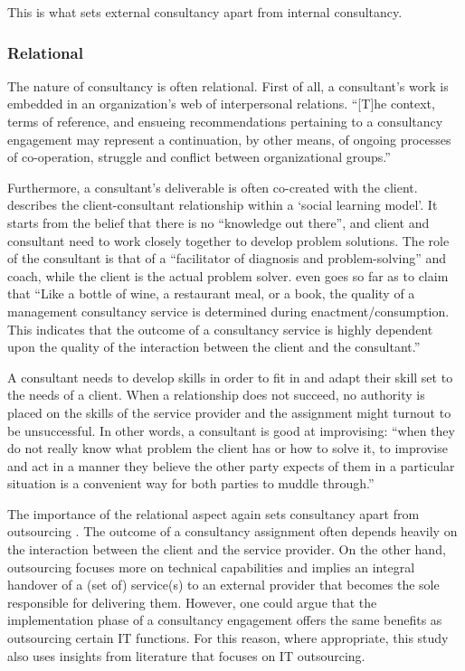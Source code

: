 \documentclass[12pt]{article}
\begin{document}
This is what sets external consultancy apart from internal consultancy.

\hypertarget{relational}{%
\subsubsection{Relational}\label{relational}}

The nature of consultancy is often relational. First of all, a
consultant's work is embedded in an organization's web of interpersonal
relations. ``{[}T{]}he context, terms of reference, and ensueing
recommendations pertaining to a consultancy engagement may represent a
continuation, by other means, of ongoing processes of co-operation,
struggle and conflict between organizational groups.''
\citep{bloomfield1995}

Furthermore, a consultant's deliverable is often co-created with the
client. \citet[290-297]{nikolova2009} describes the client-consultant
relationship within a `social learning model'. It starts from the belief
that there is no ``knowledge out there'', and client and consultant need
to work closely together to develop problem solutions. The role of the
consultant is that of a ``facilitator of diagnosis and problem-solving''
and coach, while the client is the actual problem solver.
\citet[22]{clark1998} even goes so far as to claim that ``Like a bottle
of wine, a restaurant meal, or a book, the quality of a management
consultancy service is determined during enactment/consumption. This
indicates that the outcome of a consultancy service is highly dependent
upon the quality of the interaction between the client and the
consultant.''

A consultant needs to develop skills in order to fit in and adapt their
skill set to the needs of a client. When a relationship does not
succeed, no authority is placed on the skills of the service provider
\citep[ 10]{furusten2000} and the assignment might turnout to be
unsuccessful. In other words, a consultant is good at improvising:
``when they do not really know what problem the client has or how to
solve it, to improvise and act in a manner they believe the other party
expects of them in a particular situation is a convenient way for both
parties to muddle through.'' \citep[ 270]{furusten2009}

The importance of the relational aspect again sets consultancy apart
from outsourcing \citep[ 171-173]{kipping2012}. The outcome of a
consultancy assignment often depends heavily on the interaction between
the client and the service provider. On the other hand, outsourcing
focuses more on technical capabilities and implies an integral handover
of a (set of) service(s) to an external provider that becomes the sole
responsible for delivering them. However, one could argue that the
implementation phase of a consultancy engagement offers the same
benefits as outsourcing certain IT functions. For this reason, where
appropriate, this study also uses insights from literature that focuses
on IT outsourcing.
\end{document}
